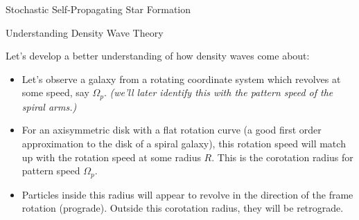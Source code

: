 \documentclass[letterpaper,landscape]{slides}
\begin{document}
\begin{slide}

\begin{center}
{\large \color{red} 
                 Stochastic Self-Propagating Star Formation }
\end{center}

\begin{center}
\end{center}

\end{slide}


\begin{slide}

\begin{center}
{\large \color{red} 
                 Understanding Density Wave Theory }
\end{center}

Let's develop a better understanding of how density waves come about:

\begin{itemize}
\item Let's observe a galaxy from a rotating coordinate system which 
revolves at some speed, say $\Omega_p$. {\em (we'll later identify this with
the pattern speed of the spiral arms.)}

\item For an axisymmetric disk with a flat rotation curve (a good
first order approximation to the disk of a spiral galaxy), this
rotation speed will match up with the rotation speed at some
radius $R$. This is the {\color{blue} corotation radius} for pattern
speed $\Omega_p$.

\item Particles inside this
radius will appear to revolve in the direction of the frame rotation (prograde).
Outside this corotation radius, they will be retrograde.

\end{itemize}

\vfill
\end{slide}
\end{document}
